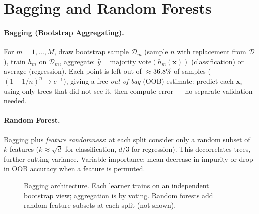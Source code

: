 \section{Bagging and Random Forests}
\label{sec:bagging-rf}
\paragraph{Bagging (Bootstrap Aggregating).} For $m=1,\dots,M$, draw bootstrap sample $\mathcal{D}_m$ (sample $n$ with replacement from $\mathcal{D}$), train $h_m$ on $\mathcal{D}_m$, aggregate: $\hat{y}=\text{majority vote}(h_m(\mathbf{x}))$ (classification) or average (regression). Each point is left out of $\approx 36.8\%$ of samples ($(1-1/n)^n\to e^{-1}$), giving a free \emph{out-of-bag} (OOB) estimate: predict each $\mathbf{x}_i$ using only trees that did not see it, then compute error --- no separate validation needed.

\paragraph{Random Forest.} Bagging plus \emph{feature randomness}: at each split consider only a random subset of $k$ features ($k\approx\sqrt{d}$ for classification, $d/3$ for regression). This decorrelates trees, further cutting variance. Variable importance: mean decrease in impurity or drop in OOB accuracy when a feature is permuted.

\begin{figure}[h]\centering
{}
\caption{Bagging architecture. Each learner trains on an independent bootstrap view; aggregation is by voting. Random forests add random feature subsets at each split (not shown).}
\label{fig:bagging}
\end{figure}

